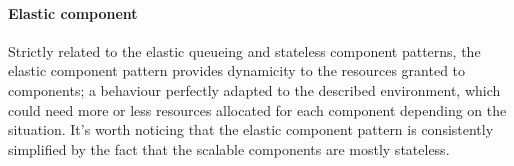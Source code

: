 \paragraph{Elastic component}
Strictly related to the elastic queueing and stateless component patterns, the elastic component pattern provides dynamicity to the resources granted to components; a behaviour perfectly adapted to the described environment, which could need more or less resources allocated for each component depending on the situation. It's worth noticing that the elastic component pattern is consistently simplified by the fact that the scalable components are mostly stateless.